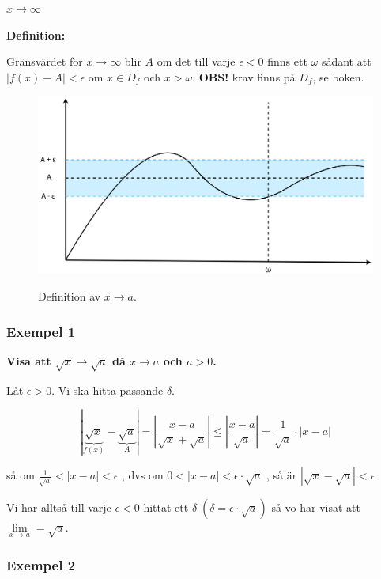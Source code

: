 \documentclass[swedish]{article}
\begin{document}
{\large\underline{$x \to \infty$}}

\smallbreak

\textbf{Definition:}

Gränsvärdet för $x \to \infty$ blir $A$ om det till varje $\epsilon < 0$ finns ett $\omega$ sådant att $|f(x) - A| < \epsilon$ om $x \in D_f$ och $x > \omega$. \textbf{OBS!} krav finns på $D_f$, se boken. 

\begin{figure}[h!]
    \includegraphics[width=14cm]{figur3.png}
    \label{fig:figur3}
    \caption{Definition av $x \to a$.}
\end{figure}

\subsubsection{Exempel 1}

\textbf{Visa att $\sqrt{x} \to \sqrt{a}$ då $x \to a$ och $a > 0$.}

Låt $\epsilon > 0$. Vi ska hitta passande $\delta$.

\[|\underbrace{\sqrt{x}}_{f(x)} - \underbrace{\sqrt{a}}_A| = \left|\frac{x-a}{\sqrt{x}+\sqrt{a}}\right| \leq \left|\frac{x-a}{\sqrt{a}}\right| = \frac{1}{\sqrt{a}} \cdot \left| x - a \right|\]

\bigbreak

så om $\frac{1}{\sqrt{a}} < |x-a| < \epsilon$ , dvs om $0 < |x-a| < \epsilon \cdot \sqrt{a}$ , så är $|\sqrt{x} - \sqrt{a} | < \epsilon$

\bigbreak

Vi har alltså till varje $\epsilon < 0$ hittat ett $\delta \; (\delta = \epsilon \cdot \sqrt{a})$ så vo har visat att $\lim\limits_{x \to a} = \sqrt{a}$.

\subsubsection{Exempel 2}
\end{document}
